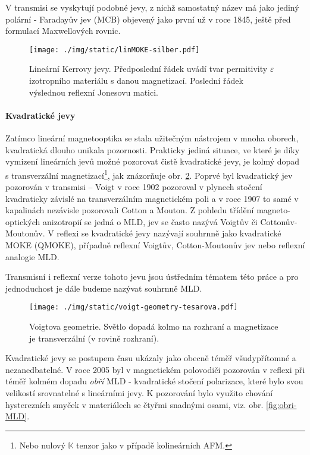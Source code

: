 V transmisi se vyskytují podobné jevy, z nichž samostatný název má jako jediný polární - Faradayův jev (MCB) objevený jako první už v roce 1845, ještě před formulací Maxwellových rovnic\cite{zvezdinModernMagnetoopticsMagnetooptical1997}.

\begin{figure}[htbp]
    \centering
    \texttt{[image: ./img/static/linMOKE-silber.pdf]}
    \caption{Lineární Kerrovy jevy. Předposlední řádek uvádí tvar permitivity $\varepsilon$ izotropního materiálu s danou magnetizací. Poslední řádek výslednou reflexní Jonesovu matici. \cite{silberQuadraticMagnetoopticKerr2019a}}
    \label{fig:MOKE-Silber}
\end{figure}

\paragraph{Kvadratické jevy}

Zatímco lineární magnetooptika se stala užitečným nástrojem v mnoha oborech, kvadratická dlouho unikala pozornosti.
Prakticky jediná situace, ve které je díky vymizení lineárních jevů možné pozorovat čistě kvadratické jevy, je kolmý dopad s transverzální magnetizací\footnote{Nebo nulový $\mathbb{K}$ tenzor jako v případě kolineárních AFM.}, jak znázorňuje obr. \ref{fig:Voigtova-geometrie}.
Poprvé byl kvadratický jev pozorován v transmisi -- Voigt v roce 1902 pozoroval v plynech stočení kvadraticky závislé na transverzálním magnetickém poli a v roce 1907 to samé v kapalinách nezávisle pozorovali Cotton a Mouton\cite{zvezdinModernMagnetoopticsMagnetooptical1997}.
Z pohledu třídění magneto-optických anizotropií se jedná o MLD, jev se často nazývá Voigtův či Cottonův-Moutonův.
V reflexi se kvadratické jevy nazývají souhrnně jako kvadratické MOKE (QMOKE), případně reflexní Voigtův, Cotton-Moutonův jev nebo reflexní analogie MLD.

Transmisní i reflexní verze tohoto jevu jsou ústředním tématem této práce a pro jednoduchost je dále budeme nazývat souhrnně MLD.

\begin{figure}[htbp]
    \centering
    \texttt{[image: ./img/static/voigt-geometry-tesarova.pdf]}
    \caption{Voigtova geometrie. Světlo dopadá kolmo na rozhraní a magnetizace je transverzální (v rovině rozhraní). \cite{tesarovaSystematicStudyMagnetic2014}}
    \label{fig:Voigtova-geometrie}
\end{figure}

Kvadratické jevy se postupem času ukázaly jako obecně téměř všudypřítomné a nezanedbatelné.
V roce 2005 byl v magnetickém polovodiči  pozorován v reflexi při téměř kolmém dopadu \emph{obří} MLD - kvadratické stočení polarizace, které bylo svou velikostí srovnatelné s lineárními jevy\cite{kimelObservationGiantMagnetic2005}.
K pozorování bylo využito chování hysterezních smyček v materiálech se čtyřmi snadnými osami, viz. obr. \ref{fig:obri-MLD}.

